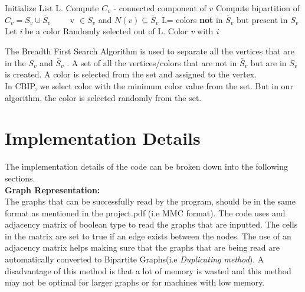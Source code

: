 \documentclass{article}
\begin{document}
	\begin{multicols}{2}%
	  \begin{minipage}{0.45\textwidth}
	    \begin{algorithmic}[1]%
	      \State Initialize List L.
	      \State Compute $C_v \mbox{ - connected component of } v$
	      \State Compute bipartition of $C_v = S_v \cup \widetilde{S_v}$
	      \State \ \ \ \  v $\in S_v$ and $N(v) \subseteq \widetilde{S_v}$
	      \State L= colors \textbf{not} in $\widetilde{S_v} \mbox{ but present in } S_v$
	      \State Let \textit{i} be a color Randomly selected out of L.
	      \State Color \textit{v} with \textit{i}
	      \EndProcedure
	    \end{algorithmic}
	  \end{minipage}
	The Breadth First Search Algorithm is used to separate all the vertices that are in the $S_v$ and $\widetilde{S_v}$ . A set of all the vertices/colors that are not in $\widetilde {S_v}$ but are in $S_v$ is created. A color is selected from the set and assigned to the vertex.\\

	 In CBIP, we select color with the minimum color value from the set. But in our algorithm, the color is selected randomly from the set.

	\end{multicols}	


\section{Implementation Details}

\bigbreak
The implementation details of the code can be broken down into the following sections.\\

\textbf{Graph Representation:}\\

The graphs that can be successfully read by the program, should be in the same format as mentioned in the project.pdf (i.e MMC format). 
The code uses and adjacency matrix of boolean type to read the graphs that are inputted. The cells in the matrix are set to true if an edge exists
between the nodes. The use of an adjacency matrix helps making sure that the graphs that are being read are automatically converted to Bipartite 
Graphs(i.e \textit{Duplicating method}). A disadvantage of this method is that a lot of memory is wasted and this method may not be optimal for larger graphs or for machines with low memory.\\
\end{document}
